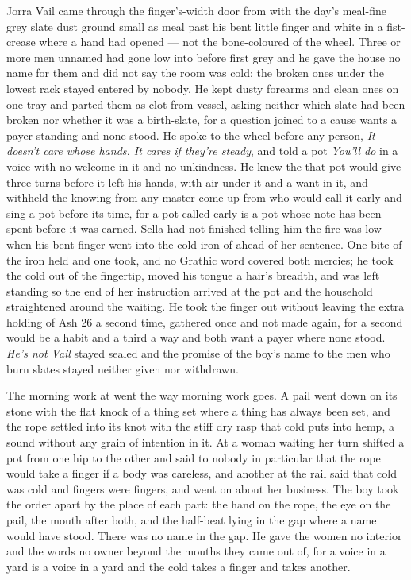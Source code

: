 Jorra Vail came through the finger's-width door from  with the day's meal-fine grey slate dust ground small as meal past his bent little finger and white in a fist-crease where a hand had opened --- not the bone-coloured  of the wheel. Three or more men unnamed had gone low into  before first grey and he gave the house no name for them and did not say the room was cold; the broken ones under the lowest rack stayed entered by nobody. He kept dusty forearms and clean ones on one tray and parted them as clot from vessel, asking neither which slate had been broken nor whether it was a birth-slate, for a question joined to a cause wants a payer standing and none stood. He spoke to the wheel before any person, \emph{It doesn't care whose hands. It cares if they're steady}, and told a pot \emph{You'll do} in a voice with no welcome in it and no unkindness. He knew the  that pot would give three turns before it left his hands, with air under it and a want in it, and withheld the knowing from any master come up from  who would call it early and sing a pot before its time, for a pot called early is a pot whose note has been spent before it was earned. Sella had not finished telling him the fire was low when his bent finger went into the cold iron of  ahead of her sentence. One bite of the iron held and one took, and no Grathic word covered both mercies; he took the cold out of the fingertip, moved his tongue a hair's breadth, and was left standing so the end of her instruction arrived at the pot and the household straightened around the waiting. He took the finger out without leaving the extra holding of Ash 26 a second time, gathered once and not made again, for a second would be a habit and a third a way and both want a payer where none stood. \emph{He's not Vail} stayed sealed and the promise of the boy's name to the men who burn slates stayed neither given nor withdrawn.

\scenebreak

The morning work at  went the way morning work goes. A pail went down on its stone with the flat knock of a thing set where a thing has always been set, and the rope settled into its knot with the stiff dry rasp that cold puts into hemp, a sound without any grain of intention in it. At  a woman waiting her turn shifted a pot from one hip to the other and said to nobody in particular that the rope would take a finger if a body was careless, and another at the rail said that cold was cold and fingers were fingers, and went on about her business. The boy took the order apart by the place of each part: the hand on the rope, the eye on the pail, the mouth after both, and the half-beat lying in the gap where a name would have stood. There was no name in the gap. He gave the women no interior and the words no owner beyond the mouths they came out of, for a voice in a yard is a voice in a yard and the cold takes a finger and takes another.

